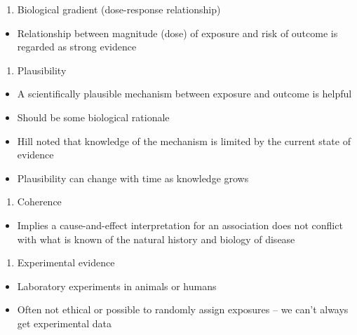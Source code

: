 \documentclass[
]{book}
\providecommand{\tightlist}{%
  \setlength{\itemsep}{0pt}\setlength{\parskip}{0pt}}
\begin{document}
\begin{enumerate}
\def\labelenumi{\arabic{enumi}.}
\setcounter{enumi}{4}
\tightlist
\item
  Biological gradient (dose-response relationship)
\end{enumerate}

\begin{itemize}
\tightlist
\item
  Relationship between magnitude (dose) of exposure and risk of outcome is regarded as strong evidence
\end{itemize}

\begin{enumerate}
\def\labelenumi{\arabic{enumi}.}
\setcounter{enumi}{5}
\tightlist
\item
  Plausibility
\end{enumerate}

\begin{itemize}
\tightlist
\item
  A scientifically plausible mechanism between exposure and outcome is helpful
\item
  Should be some biological rationale
\item
  Hill noted that knowledge of the mechanism is limited by the current state of evidence
\item
  Plausibility can change with time as knowledge grows
\end{itemize}

\begin{enumerate}
\def\labelenumi{\arabic{enumi}.}
\setcounter{enumi}{6}
\tightlist
\item
  Coherence
\end{enumerate}

\begin{itemize}
\tightlist
\item
  Implies a cause-and-effect interpretation for an association does not conflict with what is known of the natural history and biology of disease
\end{itemize}

\begin{enumerate}
\def\labelenumi{\arabic{enumi}.}
\setcounter{enumi}{7}
\tightlist
\item
  Experimental evidence
\end{enumerate}

\begin{itemize}
\tightlist
\item
  Laboratory experiments in animals or humans
\item
  Often not ethical or possible to randomly assign exposures -- we can't always get experimental data
\end{itemize}
\end{document}
